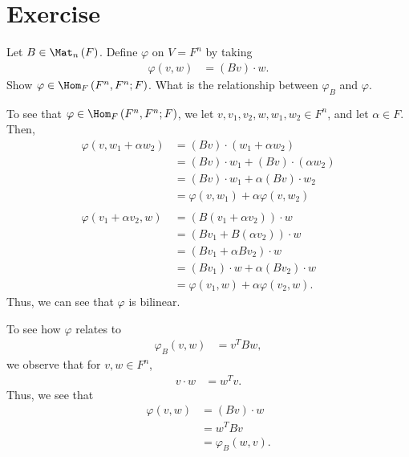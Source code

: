 \documentclass[12pt]{mypackage}
\begin{document}
\section{Exercise}%
\begin{problem}
  Let $B\in \Mat_{n}\left(F\right)$. Define $\varphi$ on $V = F^n$ by taking
  \begin{align*}
    \varphi\left(v,w\right) &= \left(Bv\right)\cdot w.
  \end{align*}
  Show $\varphi\in \Hom_{F}\left(F^n,F^n;F\right)$. What is the relationship between $\varphi_B$ and $\varphi$.
\end{problem}
\begin{solution}
  To see that $\varphi\in \Hom_{F}\left(F^n,F^n;F\right)$, we let $v,v_1,v_2,w,w_1,w_2\in F^n$, and let $\alpha\in F$. Then,
  \begin{align*}
    \varphi\left(v,w_1 + \alpha w_2\right) &= \left(Bv\right)\cdot \left(w_1 + \alpha w_2 \right)\\
                                           &= \left(Bv\right)\cdot w_1 + \left(Bv\right)\cdot \left(\alpha w_2\right)\\
                                           &= \left(Bv\right)\cdot w_1 + \alpha \left(Bv\right)\cdot w_2\\
                                           &= \varphi\left(v,w_1\right) + \alpha \varphi\left(v,w_2\right)\\
                                           \\
    \varphi\left(v_1 + \alpha v_2,w\right) &= \left(B\left(v_1 + \alpha v_2\right)\right)\cdot w\\
                                           &= \left(Bv_1 + B\left(\alpha v_2\right)\right)\cdot w\\
                                           &= \left(Bv_1 + \alpha Bv_2\right)\cdot w\\
                                           &= \left(Bv_1\right) \cdot w + \alpha \left(Bv_2\right)\cdot w\\
                                           &= \varphi\left(v_1,w\right) + \alpha \varphi\left(v_2,w\right).
  \end{align*}
  Thus, we can see that $\varphi$ is bilinear.\newline

  To see how $\varphi$ relates to
  \begin{align*}
    \varphi_{B}\left(v,w\right) &= v^{T}Bw,
  \end{align*}
  we observe that for $v,w\in F^n$,
  \begin{align*}
    v\cdot w &= w^{T}v.
  \end{align*}
  Thus, we see that
  \begin{align*}
    \varphi\left(v,w\right) &= \left(Bv\right)\cdot w\\
                            &= w^{T}Bv\\
                            &= \varphi_{B}\left(w,v\right).
  \end{align*}

\end{solution}
\end{document}
